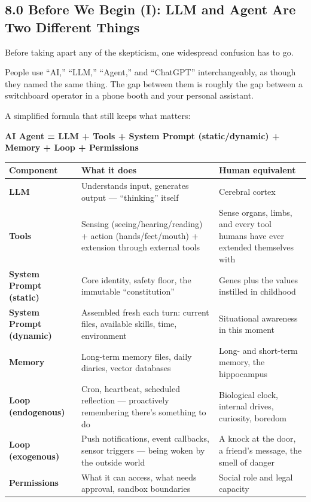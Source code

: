 \documentclass[11pt,a4paper]{article}
\begin{document}
\subsection{8.0 Before We Begin (I): LLM and Agent Are Two Different Things}

Before taking apart any of the skepticism, one widespread confusion has to go.

People use ``AI,'' ``LLM,'' ``Agent,'' and ``ChatGPT'' interchangeably, as though they named the same thing. The gap between them is roughly the gap between a switchboard operator in a phone booth and your personal assistant.

A simplified formula that still keeps what matters:

\textbf{AI Agent = LLM + Tools + System Prompt (static/dynamic) + Memory + Loop + Permissions}

\begin{center}

\begin{tabularx}{\textwidth}{lXX}
\toprule
Component & What it does & Human equivalent \\
\midrule
\textbf{LLM} & Understands input, generates output --- ``thinking'' itself & Cerebral cortex \\
\textbf{Tools} & Sensing (seeing/hearing/reading) + action (hands/feet/mouth) + extension through external tools & Sense organs, limbs, and every tool humans have ever extended themselves with \\
\textbf{System Prompt (static)} & Core identity, safety floor, the immutable ``constitution'' & Genes plus the values instilled in childhood \\
\textbf{System Prompt (dynamic)} & Assembled fresh each turn: current files, available skills, time, environment & Situational awareness in this moment \\
\textbf{Memory} & Long-term memory files, daily diaries, vector databases & Long- and short-term memory, the hippocampus \\
\textbf{Loop (endogenous)} & Cron, heartbeat, scheduled reflection --- proactively remembering there's something to do & Biological clock, internal drives, curiosity, boredom \\
\textbf{Loop (exogenous)} & Push notifications, event callbacks, sensor triggers --- being woken by the outside world & A knock at the door, a friend's message, the smell of danger \\
\textbf{Permissions} & What it can access, what needs approval, sandbox boundaries & Social role and legal capacity \\
\bottomrule
\end{tabularx}
\end{center}
\end{document}
